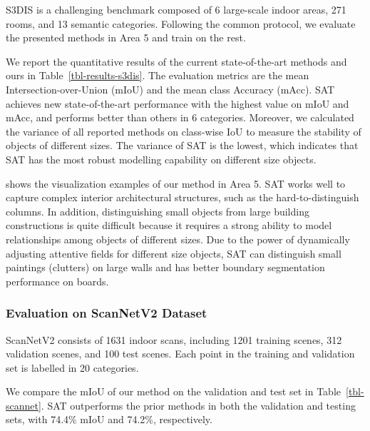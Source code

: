 \documentclass[10pt,twocolumn,letterpaper]{article}
\begin{document}
\quad S3DIS\cite{datasets3dis} is a challenging benchmark composed of 6 large-scale indoor areas, 271 rooms, and 13 semantic categories. Following the common protocol\cite{segcloud2017}, we evaluate the presented methods in Area 5 and train on the rest.



We report the quantitative results of the current state-of-the-art methods and ours in Table~\ref{tbl-results-s3dis}. The evaluation metrics are the mean Intersection-over-Union (mIoU) and the mean class Accuracy (mAcc). SAT achieves new state-of-the-art performance with the highest value on mIoU and mAcc, and performs better than others in 6 categories. Moreover, we calculated the variance of all reported methods on class-wise IoU to measure the stability of objects of different sizes. The variance of SAT is the lowest, which indicates that SAT has the most robust modelling capability on different size objects.

 shows the visualization examples of our method in Area 5. SAT works well to capture complex interior architectural structures, such as the hard-to-distinguish columns. In addition, distinguishing small objects from large building constructions is quite difficult because it requires a strong ability to model relationships among objects of different sizes. Due to the power of dynamically adjusting attentive fields for different size objects, SAT can distinguish small paintings (clutters) on large walls and has better boundary segmentation performance on boards. 









\subsubsection{Evaluation on ScanNetV2 Dataset}
\quad ScanNetV2\cite{datasetscannet} consists of 1631 indoor scans, including 1201 training scenes, 312 validation scenes, and 100 test scenes. Each point in the training and validation set is labelled in 20 categories. 



We compare the mIoU of our method on the validation and test set in Table~\ref{tbl-scannet}. SAT outperforms the prior methods in both the validation and testing sets, with 74.4\% mIoU and 74.2\%, respectively. 
\end{document}
